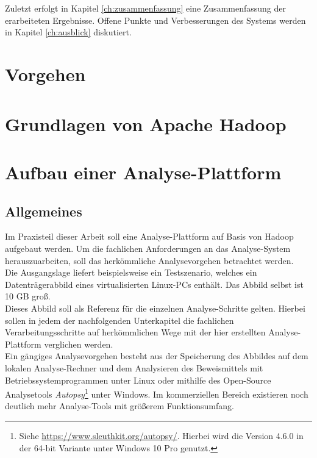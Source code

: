 \documentclass[11pt,a4paper]{report} %
\begin{document}
\noindent
Zuletzt erfolgt in Kapitel \ref{ch:zusammenfassung} eine Zusammenfassung der erarbeiteten Ergebnisse. Offene Punkte und Verbesserungen des Systems werden in Kapitel \ref{ch:ausblick} diskutiert. 


\chapter{Vorgehen}
\label{ch:development_approach}




\chapter{Grundlagen von Apache Hadoop\textsuperscript{\textregistered}}
\label{ch:theory_hadoop}



\chapter{Aufbau einer Analyse-Plattform}
\label{ch:praxis_analysis}

\section{Allgemeines}
Im Praxisteil dieser Arbeit soll eine Analyse-Plattform auf Basis von Hadoop aufgebaut werden. Um die fachlichen Anforderungen an das Analyse-System herauszuarbeiten, soll das herkömmliche Analysevorgehen betrachtet werden.\\
Die Ausgangslage liefert beispielsweise ein Testszenario, welches ein Datenträgerabbild eines virtualisierten Linux-PCs enthält. Das Abbild selbst ist 10 GB groß.\\

\noindent
Dieses Abbild soll als Referenz für die einzelnen Analyse-Schritte gelten. 
Hierbei sollen in jedem der nachfolgenden Unterkapitel die fachlichen Verarbeitungsschritte auf herkömmlichen Wege mit der hier erstellten Analyse-Plattform verglichen werden.\\
Ein gängiges Analysevorgehen besteht aus der Speicherung des Abbildes auf dem lokalen Analyse-Rechner und dem Analysieren des Beweismittels mit Betriebssystemprogrammen unter Linux oder mithilfe des Open-Source Analysetools \textit{Autopsy}\footnote{Siehe \url{https://www.sleuthkit.org/autopsy/}. Hierbei wird die Version 4.6.0 in der 64-bit Variante unter Windows 10 Pro genutzt.} unter Windows. Im kommerziellen Bereich existieren noch deutlich mehr Analyse-Tools mit größerem Funktionsumfang. 
\end{document}
